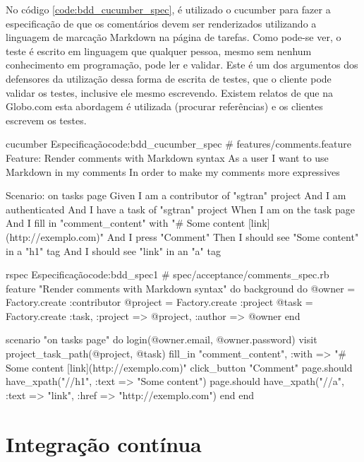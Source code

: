 No código \ref{code:bdd_cucumber_spec}, é utilizado o cucumber para fazer a especificação de que os comentários devem ser renderizados utilizando a linguagem de marcação Markdown na página de tarefas. Como pode-se ver, o teste é escrito em linguagem que qualquer pessoa, mesmo sem nenhum conhecimento em programação, pode ler e validar. Este é um dos argumentos dos defensores da utilização dessa forma de escrita de testes, que o cliente pode validar os testes, inclusive ele mesmo escrevendo. Existem relatos de que na Globo.com esta abordagem é utilizada (procurar referências) e os clientes escrevem os testes.

\begin{mycode}{cucumber}%
{Especificação}{code:bdd_cucumber_spec}
# features/comments.feature
Feature: Render comments with Markdown syntax
  As a user
  I want to use Markdown in my comments
  In order to make my comments more expressives

  Scenario: on tasks page
    Given I am a contributor of "sgtran" project
    And I am authenticated
    And I have a task of "sgtran" project
    When I am on the task page
    And I fill in "comment_content" with "# Some content [link](http://exemplo.com)"
    And I press "Comment"
    Then I should see "Some content" in a "h1" tag
    And I should see "link" in an "a" tag
\end{mycode}

\begin{mycode}{rspec}%
{Especificação}{code:bdd_spec1}
# spec/acceptance/comments_spec.rb
feature "Render comments with Markdown syntax" do
  background do
    @owner = Factory.create :contributor
    @project = Factory.create :project
    @task = Factory.create :task, :project => @project, :author => @owner
  end

  scenario "on tasks page" do
    login(@owner.email, @owner.password)
    visit project_task_path(@project, @task)
    fill_in "comment_content", :with => "# Some content [link](http://exemplo.com)"
    click_button "Comment"
    page.should have_xpath("//h1", :text => "Some content")
    page.should have_xpath("//a", :text => "link", :href => "http://exemplo.com")
  end
end
\end{mycode}



\section{Integração contínua}

